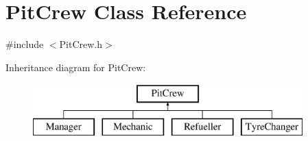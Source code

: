 \hypertarget{class_pit_crew}{}\section{Pit\+Crew Class Reference}
\label{class_pit_crew}


{\ttfamily \#include $<$Pit\+Crew.\+h$>$}

Inheritance diagram for Pit\+Crew\+:\begin{figure}[H]
\begin{center}
\leavevmode
\includegraphics[height=2.000000cm]{class_pit_crew}
\end{center}
\end{figure}

